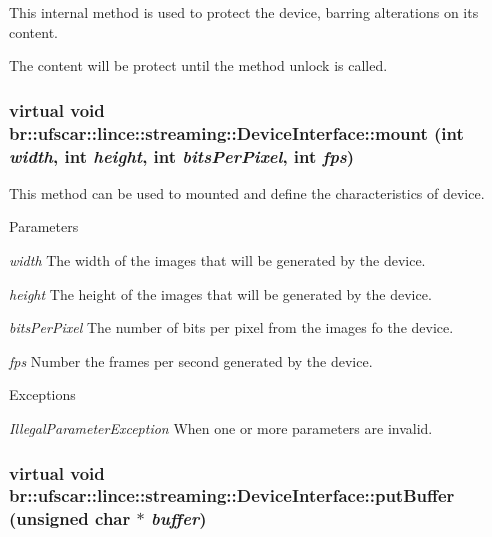 This internal method is used to protect the device, barring alterations on its content. 

The content will be protect until the method unlock is called. \hypertarget{classbr_1_1ufscar_1_1lince_1_1streaming_1_1DeviceInterface_afb64a94cc5d0febe0cc167675a0c92bc}{
\subsubsection[{mount}]{\setlength{\rightskip}{0pt plus 5cm}virtual void br::ufscar::lince::streaming::DeviceInterface::mount (int {\em width}, \/  int {\em height}, \/  int {\em bitsPerPixel}, \/  int {\em fps})}}
\label{classbr_1_1ufscar_1_1lince_1_1streaming_1_1DeviceInterface_afb64a94cc5d0febe0cc167675a0c92bc}


This method can be used to mounted and define the characteristics of device. 


\begin{DoxyParams}{Parameters}
\item[{\em width}]The width of the images that will be generated by the device. \item[{\em height}]The height of the images that will be generated by the device. \item[{\em bitsPerPixel}]The number of bits per pixel from the images fo the device. \item[{\em fps}]Number the frames per second generated by the device. \end{DoxyParams}

\begin{DoxyExceptions}{Exceptions}
\item[{\em IllegalParameterException}]When one or more parameters are invalid. \end{DoxyExceptions}
\hypertarget{classbr_1_1ufscar_1_1lince_1_1streaming_1_1DeviceInterface_a72af172828b8d1773fcf9e5d62d08353}{
\subsubsection[{putBuffer}]{\setlength{\rightskip}{0pt plus 5cm}virtual void br::ufscar::lince::streaming::DeviceInterface::putBuffer (unsigned char $\ast$ {\em buffer})}}
\label{classbr_1_1ufscar_1_1lince_1_1streaming_1_1DeviceInterface_a72af172828b8d1773fcf9e5d62d08353}


